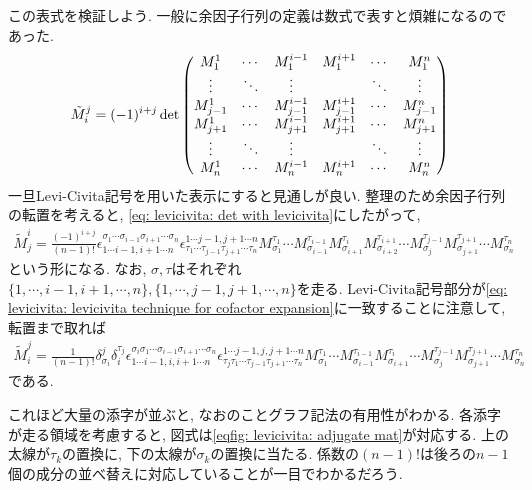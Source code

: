 \documentclass[dvipdfmx]{jsarticle}
\begin{document}
この表式を検証しよう.
一般に余因子行列の定義は数式で表すと煩雑になるのであった.
\begin{align*}
    \tilde{M}_i^j
    =
    (-1)^{i+j}
    \det\mqty(
        M_1^1 & \cdots & M_1^{i-1} & M_1^{i+1} & \cdots & M_1^n
        \\
        \vdots & \ddots & \vdots & & \ddots & \vdots
        \\
        M_{j-1}^1 & \cdots & M_{j-1}^{i-1} & M_{j-1}^{i+1} & \cdots & M_{j-1}^n
        \\
        M_{j+1}^1 & \cdots & M_{j+1}^{i-1} & M_{j+1}^{i+1} & \cdots & M_{j+1}^n
        \\
        \vdots & \ddots & \vdots & & \ddots & \vdots
        \\
        M_n^1 & \cdots & M_n^{i-1} & M_n^{i+1} & \cdots & M_n^n
    )
\end{align*}
一旦Levi-Civita記号を用いた表示にすると見通しが良い.
整理のため余因子行列の転置を考えると, \eqref{eq: levicivita: det with levicivita}にしたがって,
\begin{align*}
    \tilde{M}_j^i
    =
    \frac{(-1)^{i+j}}{(n-1)!}
    \epsilon_{1\cdots i-1,i+1\cdots n}^{\sigma_1\cdots\sigma_{i-1}\sigma_{i+1}\cdots\sigma_n}
    \epsilon^{1\cdots j-1,j+1\cdots n}_{\tau_1\cdots\tau_{j-1}\tau_{j+1}\cdots\tau_n}
    M_{\sigma_1}^{\tau_1}
    \cdots
    M_{\sigma_{i-1}}^{\tau_{i-1}}
    M_{\sigma_{i+1}}^{\tau_i}
    M_{\sigma_{i+2}}^{\tau_{i+1}}
    \cdots
    M_{\sigma_j}^{\tau_{j-1}}
    M_{\sigma_{j+1}}^{\tau_{j+1}}
    \cdots
    M_{\sigma_n}^{\tau_n}
\end{align*}
という形になる.
なお, $\sigma, \tau$はそれぞれ$\{1, \cdots, i-1, i+1, \cdots, n\}, \{1, \cdots, j-1, j+1, \cdots, n\}$を走る.
Levi-Civita記号部分が\eqref{eq: levicivita: levicivita technique for cofactor expansion}に一致することに注意して, 転置まで取れば
\begin{align*}
    \tilde{M}_i^j
    =
    \frac{1}{(n-1)!}
    \delta_{\sigma_i}^j\delta_i^{\tau_j}
    \epsilon_{1\cdots i-1,i,i+1\cdots n}^{\sigma_i\sigma_1\cdots\sigma_{i-1}\sigma_{i+1}\cdots\sigma_n}
    \epsilon^{1\cdots j-1,j,j+1\cdots n}_{\tau_j\tau_1\cdots\tau_{j-1}\tau_{j+1}\cdots\tau_n}
    M_{\sigma_1}^{\tau_1}
    \cdots
    M_{\sigma_{i-1}}^{\tau_{i-1}}
    M_{\sigma_{i+1}}^{\tau_i}
    \cdots
    M_{\sigma_j}^{\tau_{j-1}}
    M_{\sigma_{j+1}}^{\tau_{j+1}}
    \cdots
    M_{\sigma_n}^{\tau_n}
\end{align*}
である.

これほど大量の添字が並ぶと, なおのことグラフ記法の有用性がわかる.
各添字が走る領域を考慮すると, 図式は\eqref{eqfig: levicivita: adjugate mat}が対応する.
上の太線が$\tau_k$の置換に, 下の太線が$\sigma_k$の置換に当たる.
係数の$(n-1)!$は後ろの$n-1$個の成分の並べ替えに対応していることが一目でわかるだろう.
\end{document}
